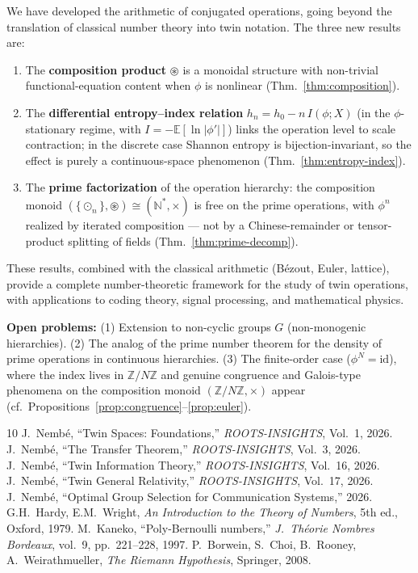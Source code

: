 \documentclass[11pt,twocolumn]{article}
\theoremstyle{plain}
\theoremstyle{definition}
\theoremstyle{remark}
\newcommand{\N}{\mathbb{N}}
\newcommand{\Z}{\mathbb{Z}}
\begin{document}
We have developed the arithmetic of conjugated operations, going beyond the translation of classical number theory into twin notation. The three new results are:

\begin{enumerate}
    \item The \textbf{composition product} $\circledast$ is a monoidal structure with non-trivial functional-equation content when $\phi$ is nonlinear (Thm.~\ref{thm:composition}).
    \item The \textbf{differential entropy--index relation} $h_n = h_0 - n\,I(\phi;X)$ (in the $\phi$-stationary regime, with $I = -\mathbb{E}[\ln|\phi'|]$) links the operation level to scale contraction; in the discrete case Shannon entropy is bijection-invariant, so the effect is purely a continuous-space phenomenon (Thm.~\ref{thm:entropy-index}).
    \item The \textbf{prime factorization} of the operation hierarchy: the composition monoid $(\{\odot_n\}, \circledast) \cong (\N^*, \times)$ is free on the prime operations, with $\phi^n$ realized by iterated composition --- not by a Chinese-remainder or tensor-product splitting of fields (Thm.~\ref{thm:prime-decomp}).
\end{enumerate}

These results, combined with the classical arithmetic (B\'ezout, Euler, lattice), provide a complete number-theoretic framework for the study of twin operations, with applications to coding theory, signal processing, and mathematical physics.

\textbf{Open problems:} (1) Extension to non-cyclic groups $G$ (non-monogenic hierarchies). (2) The analog of the prime number theorem for the density of prime operations in continuous hierarchies. (3) The finite-order case ($\phi^N = \mathrm{id}$), where the index lives in $\Z/N\Z$ and genuine congruence and Galois-type phenomena on the composition monoid $(\Z/N\Z, \times)$ appear (cf.\ Propositions~\ref{prop:congruence}--\ref{prop:euler}).


\begin{thebibliography}{10}
 J.~Nemb\'e, ``Twin Spaces: Foundations,'' \emph{ROOTS-INSIGHTS}, Vol.~1, 2026.
 J.~Nemb\'e, ``The Transfer Theorem,'' \emph{ROOTS-INSIGHTS}, Vol.~3, 2026.
 J.~Nemb\'e, ``Twin Information Theory,'' \emph{ROOTS-INSIGHTS}, Vol.~16, 2026.
 J.~Nemb\'e, ``Twin General Relativity,'' \emph{ROOTS-INSIGHTS}, Vol.~17, 2026.
 J.~Nemb\'e, ``Optimal Group Selection for Communication Systems,'' 2026.
 G.H.~Hardy, E.M.~Wright, \emph{An Introduction to the Theory of Numbers}, 5th ed., Oxford, 1979.
 M.~Kaneko, ``Poly-Bernoulli numbers,'' \emph{J.\ Th\'eorie Nombres Bordeaux}, vol.~9, pp.~221--228, 1997.
 P.~Borwein, S.~Choi, B.~Rooney, A.~Weirathmueller, \emph{The Riemann Hypothesis}, Springer, 2008.
\end{thebibliography}
\end{document}
